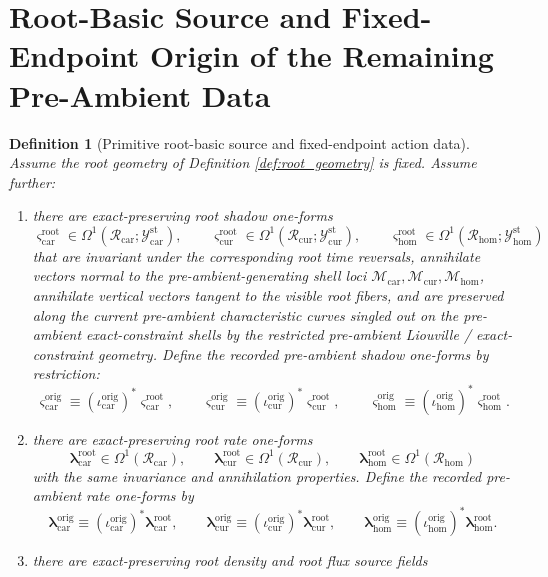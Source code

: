 \documentclass[11pt]{article}
\newcommand{\TensorStatTagClass}{\mathcal Y_{\mathrm{car}}^{\mathrm{st}}}
\newcommand{\CurStatTagClass}{\mathcal Y_{\mathrm{cur}}^{\mathrm{st}}}
\newcommand{\HomStatTagClass}{\mathcal Y_{\mathrm{hom}}^{\mathrm{st}}}
\newcommand{\TensorOriginSpace}{\mathcal M_{\mathrm{car}}}
\newcommand{\CurOriginSpace}{\mathcal M_{\mathrm{cur}}}
\newcommand{\HomOriginSpace}{\mathcal M_{\mathrm{hom}}}
\newcommand{\TensorOriginShadowForm}{\boldsymbol{\varsigma}_{\mathrm{car}}^{\mathrm{orig}}}
\newcommand{\CurOriginShadowForm}{\boldsymbol{\varsigma}_{\mathrm{cur}}^{\mathrm{orig}}}
\newcommand{\HomOriginShadowForm}{\boldsymbol{\varsigma}_{\mathrm{hom}}^{\mathrm{orig}}}
\newcommand{\TensorOriginRateForm}{\boldsymbol{\lambda}_{\mathrm{car}}^{\mathrm{orig}}}
\newcommand{\CurOriginRateForm}{\boldsymbol{\lambda}_{\mathrm{cur}}^{\mathrm{orig}}}
\newcommand{\HomOriginRateForm}{\boldsymbol{\lambda}_{\mathrm{hom}}^{\mathrm{orig}}}
\newcommand{\TensorRootSpace}{\mathcal R_{\mathrm{car}}}
\newcommand{\CurRootSpace}{\mathcal R_{\mathrm{cur}}}
\newcommand{\HomRootSpace}{\mathcal R_{\mathrm{hom}}}
\newcommand{\TensorOriginInc}{\iota_{\mathrm{car}}^{\mathrm{orig}}}
\newcommand{\CurOriginInc}{\iota_{\mathrm{cur}}^{\mathrm{orig}}}
\newcommand{\HomOriginInc}{\iota_{\mathrm{hom}}^{\mathrm{orig}}}
\newcommand{\TensorRootShadowForm}{\boldsymbol{\varsigma}_{\mathrm{car}}^{\mathrm{root}}}
\newcommand{\CurRootShadowForm}{\boldsymbol{\varsigma}_{\mathrm{cur}}^{\mathrm{root}}}
\newcommand{\HomRootShadowForm}{\boldsymbol{\varsigma}_{\mathrm{hom}}^{\mathrm{root}}}
\newcommand{\TensorRootRateForm}{\boldsymbol{\lambda}_{\mathrm{car}}^{\mathrm{root}}}
\newcommand{\CurRootRateForm}{\boldsymbol{\lambda}_{\mathrm{cur}}^{\mathrm{root}}}
\newcommand{\HomRootRateForm}{\boldsymbol{\lambda}_{\mathrm{hom}}^{\mathrm{root}}}
\newtheorem{definition}{Definition}
\begin{document}
\section{Root-Basic Source and Fixed-Endpoint Origin of the Remaining Pre-Ambient Data}

\begin{definition}[Primitive root-basic source and fixed-endpoint action data]
\label{def:root_basic}
Assume the root geometry of Definition \ref{def:root_geometry} is fixed. Assume further:
\begin{enumerate}
    \item there are exact-preserving root shadow one-forms
    \[
    \TensorRootShadowForm\in\Omega^1(\TensorRootSpace;\TensorStatTagClass),\qquad
    \CurRootShadowForm\in\Omega^1(\CurRootSpace;\CurStatTagClass),\qquad
    \HomRootShadowForm\in\Omega^1(\HomRootSpace;\HomStatTagClass)
    \]
    that are invariant under the corresponding root time reversals, annihilate vectors normal to the pre-ambient-generating shell loci \(\TensorOriginSpace,\CurOriginSpace,\HomOriginSpace\), annihilate vertical vectors tangent to the visible root fibers, and are preserved along the current pre-ambient characteristic curves singled out on the pre-ambient exact-constraint shells by the restricted pre-ambient Liouville / exact-constraint geometry. Define the recorded pre-ambient shadow one-forms by restriction:
    \begin{equation}
    \TensorOriginShadowForm\equiv(\TensorOriginInc)^*\TensorRootShadowForm,\qquad
    \CurOriginShadowForm\equiv(\CurOriginInc)^*\CurRootShadowForm,\qquad
    \HomOriginShadowForm\equiv(\HomOriginInc)^*\HomRootShadowForm.
    \label{eq:origin_shadow_from_root}
    \end{equation}
    \item there are exact-preserving root rate one-forms
    \[
    \TensorRootRateForm\in\Omega^1(\TensorRootSpace),\qquad
    \CurRootRateForm\in\Omega^1(\CurRootSpace),\qquad
    \HomRootRateForm\in\Omega^1(\HomRootSpace)
    \]
    with the same invariance and annihilation properties. Define the recorded pre-ambient rate one-forms by
    \begin{equation}
    \TensorOriginRateForm\equiv(\TensorOriginInc)^*\TensorRootRateForm,\qquad
    \CurOriginRateForm\equiv(\CurOriginInc)^*\CurRootRateForm,\qquad
    \HomOriginRateForm\equiv(\HomOriginInc)^*\HomRootRateForm.
    \label{eq:origin_rate_from_root}
    \end{equation}
    \item there are exact-preserving root density and root flux source fields

\end{enumerate}
\end{definition}
\end{document}
